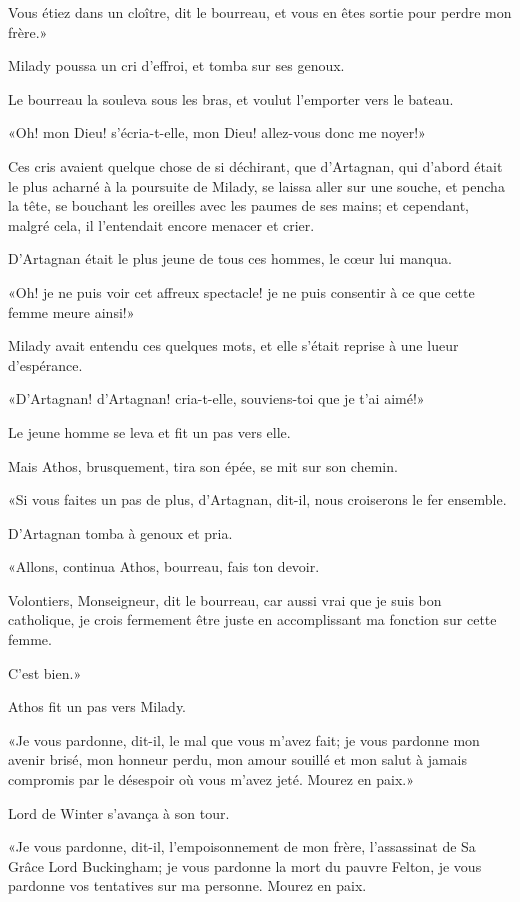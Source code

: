 \speak  Vous étiez dans un cloître, dit le bourreau, et vous en êtes sortie pour perdre mon frère.» 

Milady poussa un cri d'effroi, et tomba sur ses genoux. 

Le bourreau la souleva sous les bras, et voulut l'emporter vers le bateau. 

«Oh! mon Dieu! s'écria-t-elle, mon Dieu! allez-vous donc me noyer!» 

Ces cris avaient quelque chose de si déchirant, que d'Artagnan, qui d'abord était le plus acharné à la poursuite de Milady, se laissa aller sur une souche, et pencha la tête, se bouchant les oreilles avec les paumes de ses mains; et cependant, malgré cela, il l'entendait encore menacer et crier. 

D'Artagnan était le plus jeune de tous ces hommes, le cœur lui manqua. 

«Oh! je ne puis voir cet affreux spectacle! je ne puis consentir à ce que cette femme meure ainsi!» 

Milady avait entendu ces quelques mots, et elle s'était reprise à une lueur d'espérance. 

«D'Artagnan! d'Artagnan! cria-t-elle, souviens-toi que je t'ai aimé!» 

Le jeune homme se leva et fit un pas vers elle. 

Mais Athos, brusquement, tira son épée, se mit sur son chemin. 

«Si vous faites un pas de plus, d'Artagnan, dit-il, nous croiserons le fer ensemble. 

D'Artagnan tomba à genoux et pria. 

«Allons, continua Athos, bourreau, fais ton devoir. 

\speak  Volontiers, Monseigneur, dit le bourreau, car aussi vrai que je suis bon catholique, je crois fermement être juste en accomplissant ma fonction sur cette femme. 

\speak  C'est bien.» 

Athos fit un pas vers Milady. 

«Je vous pardonne, dit-il, le mal que vous m'avez fait; je vous pardonne mon avenir brisé, mon honneur perdu, mon amour souillé et mon salut à jamais compromis par le désespoir où vous m'avez jeté. Mourez en paix.» 

Lord de Winter s'avança à son tour. 

«Je vous pardonne, dit-il, l'empoisonnement de mon frère, l'assassinat de Sa Grâce Lord Buckingham; je vous pardonne la mort du pauvre Felton, je vous pardonne vos tentatives sur ma personne. Mourez en paix. 

